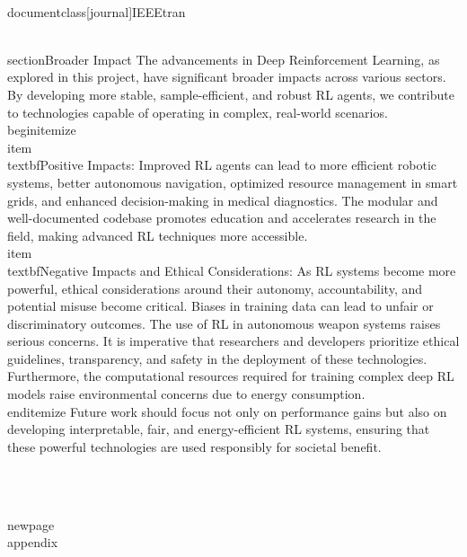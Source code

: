 \\documentclass[journal]{IEEEtran}
\begin{document}
\\section{Broader Impact}
The advancements in Deep Reinforcement Learning, as explored in this project, have significant broader impacts across various sectors. By developing more stable, sample-efficient, and robust RL agents, we contribute to technologies capable of operating in complex, real-world scenarios.
\\begin{itemize}
    \\item \\textbf{Positive Impacts}: Improved RL agents can lead to more efficient robotic systems, better autonomous navigation, optimized resource management in smart grids, and enhanced decision-making in medical diagnostics. The modular and well-documented codebase promotes education and accelerates research in the field, making advanced RL techniques more accessible.
    \\item \\textbf{Negative Impacts and Ethical Considerations}: As RL systems become more powerful, ethical considerations around their autonomy, accountability, and potential misuse become critical. Biases in training data can lead to unfair or discriminatory outcomes. The use of RL in autonomous weapon systems raises serious concerns. It is imperative that researchers and developers prioritize ethical guidelines, transparency, and safety in the deployment of these technologies. Furthermore, the computational resources required for training complex deep RL models raise environmental concerns due to energy consumption.
\\end{itemize}
Future work should focus not only on performance gains but also on developing interpretable, fair, and energy-efficient RL systems, ensuring that these powerful technologies are used responsibly for societal benefit.

\
\ %

\\newpage
\\appendix
\end{document}
